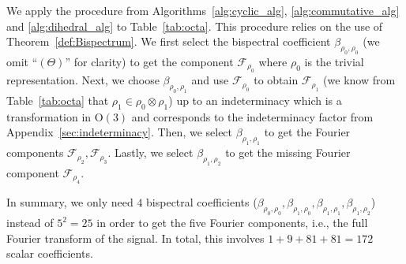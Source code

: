 \documentclass{article}
\theoremstyle{plain}
\theoremstyle{definition}
\theoremstyle{remark}
\begin{document}
We apply the procedure from Algorithms~\ref{alg:cyclic_alg}, \ref{alg:commutative_alg} and \ref{alg:dihedral_alg} to Table~\ref{tab:octa}. This procedure relies on the use of Theorem~\ref{def:Bispectrum}. We first select the bispectral coefficient $\beta_{\rho_0, \rho_0}$ (we omit ``$(\Theta)$'' for clarity) to get the component $\mathcal{F}_{\rho_0 }$ where $\rho_0$ is the trivial representation. Next, we choose $\beta_{\rho_0,\rho_1}$ and use $\mathcal{F}_{\rho_0}$  to obtain $\mathcal{F}_{\rho_1}$ (we know from Table~\ref{tab:octa} that $\rho_1\in\rho_0\otimes\rho_1$) up to an indeterminacy which is a transformation in $\mathrm{O}(3)$ and corresponds to the indeterminacy factor from Appendix~\ref{sec:indeterminacy}. Then, we select  $\beta_{\rho_1, \rho_1}$ to get the Fourier components $\mathcal{F}_{\rho_2}, \mathcal{F}_{\rho_3}$. Lastly, we select $\beta_{\rho_1, \rho_2}$ to get the missing Fourier component $\mathcal{F}_{\rho_4}$.

In summary, we only need $4$ bispectral coefficients ($\beta_{\rho_0, \rho_0}, \beta_{\rho_1, \rho_0}, \beta_{\rho_1, \rho_1}, \beta_{\rho_1, \rho_2}$) instead of $5^2 = 25$ in order to get the five Fourier components, i.e., the full Fourier transform of the signal. In total, this involves $1+9+81+81=172$ scalar coefficients.
\end{document}
